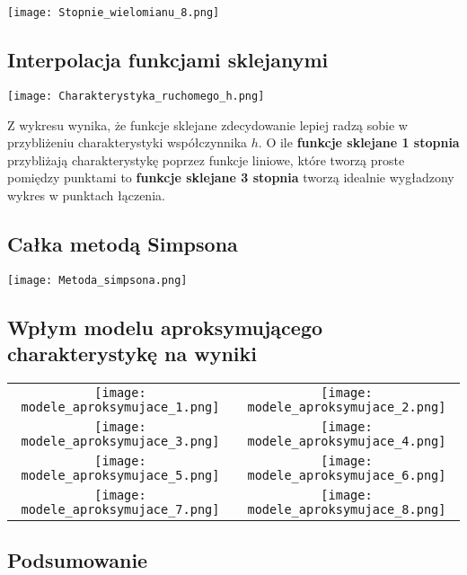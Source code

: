 \documentclass[varwidth,12pt,a4paper]{article}
\begin{document}
\begin{table}[H]
    \centering{}
\end{table}

\texttt{[image: Stopnie\_wielomianu\_8.png]} 

\subsection{Interpolacja funkcjami sklejanymi}

\texttt{[image: Charakterystyka\_ruchomego\_h.png]} 

Z wykresu wynika, że funkcje sklejane zdecydowanie lepiej radzą sobie w przybliżeniu charakterystyki
współczynnika $h$. O ile \textbf{funkcje sklejane 1 stopnia} przybliżają charakterystykę poprzez funkcje
liniowe, które tworzą proste pomiędzy punktami to \textbf{funkcje sklejane 3 stopnia} tworzą idealnie
wygładzony wykres w punktach łączenia.

\subsection{Całka metodą Simpsona}

\texttt{[image: Metoda\_simpsona.png]} 

\subsection{Wpłym modelu aproksymującego charakterystykę na wyniki}

\begin{tabular}{cc}
    \texttt{[image: modele\_aproksymujace\_1.png]} &
    \texttt{[image: modele\_aproksymujace\_2.png]} \\
    \texttt{[image: modele\_aproksymujace\_3.png]} &
    \texttt{[image: modele\_aproksymujace\_4.png]} \\
    \texttt{[image: modele\_aproksymujace\_5.png]} &
    \texttt{[image: modele\_aproksymujace\_6.png]} \\
    \texttt{[image: modele\_aproksymujace\_7.png]} &
    \texttt{[image: modele\_aproksymujace\_8.png]} 
\end{tabular}

\subsection{Podsumowanie}
\end{document}
